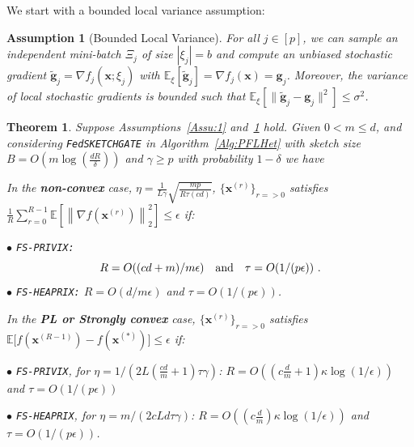 \documentclass[sigconf, anonymous, review]{acmart}
\newtheorem{theorem}{Theorem}
\newtheorem{assumption}{Assumption}
\begin{document}
We start with a bounded local variance assumption:
\begin{assumption}[Bounded Local Variance]\label{Assu:2}
For all $j\in [p]$, we can sample an independent mini-batch $\Xi_j$ of size $|{\xi}_j| = b$ and compute an unbiased stochastic gradient $\tilde{\mathbf{g}}_j = \nabla f_j(\boldsymbol{x}; \xi_j)$ with $\mathbb{E}_{\xi}[\tilde{\mathbf{g}}_j] = \nabla f_{j}(\boldsymbol{x})={\mathbf{g}}_j$. 
Moreover, the variance of local stochastic gradients is bounded such that $
\mathbb{E}_{\xi}\left[\|\tilde{\mathbf{g}}_j-{\mathbf{g}}_j\|^2\right]\leq \sigma^2$.
\end{assumption}
\begin{theorem}\label{thm:hetreg_case}
Suppose Assumptions~\ref{Assu:1} and~\ref{Assu:2} hold. Given $0<m\leq d$, and considering \texttt{FedSKETCHGATE} in Algorithm~\ref{Alg:PFLHet} with sketch size $B=O\left(m\log\left(\frac{d R}{\delta}\right)\right)$ and $\gamma\geq p$ with probability $1-\delta$ we have  



In the \textbf{non-convex} case, $\eta=\frac{1}{L\gamma}\sqrt{\frac{mp}{R\tau\left(cd\right)}}$, $\{ {\boldsymbol{x}}^{(r)}\}_{r=>0}$ satisfies  $\frac{1}{R}\sum_{r=0}^{R-1}\mathbb{E}\left[\left\|\nabla f({\boldsymbol{x}}^{(r)})\right\|_2^2\right]\leq {\epsilon}$ if: 
 
\noindent $\bullet$ \texttt{FS-PRIVIX:}    
\begin{equation}\notag
R=O((cd+m)/m\epsilon) \quad \textrm{and} \quad \tau=O(1/(p\epsilon))\ .
 \end{equation}
\noindent $\bullet$ \texttt{FS-HEAPRIX:} $R=O(d/m\epsilon)$ and $\tau=O(1/(p\epsilon))$.

In the \textbf{PL or Strongly convex} case, $\{ {\boldsymbol{x}}^{(r)}\}_{r=>0}$ satisfies $\mathbb{E}\Big[f({\boldsymbol{x}}^{(R-1)})-f({\boldsymbol{x}}^{(*)})\Big]\leq \epsilon$ if: 

\noindent $\bullet$ \texttt{FS-PRIVIX}, for $\eta=1/(2L(\frac{cd}{m}+1)\tau\gamma)$: $R=O\left((c\frac{d}{m}+1)\kappa \log(1/\epsilon)\right)$ and $\tau=O\left(1/(p\epsilon)\right)$

\noindent $\bullet$ \texttt{FS-HEAPRIX}, for $\eta=m/(2cLd\tau\gamma)$: $R=O\left((c\frac{d}{m})\kappa \log(1/\epsilon)\right)$ and $\tau=O\left(1/(p\epsilon)\right)$.

 

 \end{theorem}
\end{document}

